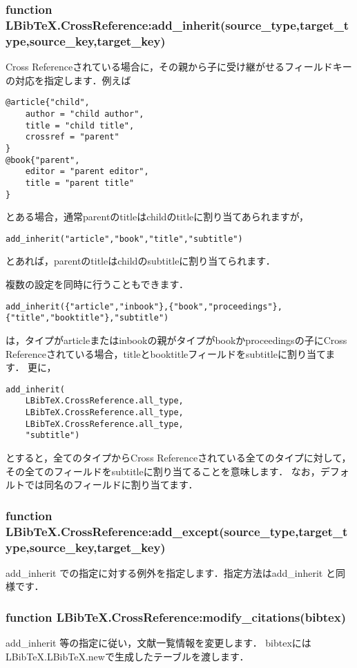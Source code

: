 \documentclass[dvipdfmx,a4paper]{jsarticle}
\begin{document}
\subsubsection{function LBibTeX.CrossReference:add\_inherit(source\_type,target\_type,source\_key,target\_key)}
Cross Referenceされている場合に，その親から子に受け継がせるフィールドキーの対応を指定します．例えば
\begin{verbatim}
@article{"child",
    author = "child author",
    title = "child title",
    crossref = "parent"
}
@book{"parent",
    editor = "parent editor",
    title = "parent title"
}
\end{verbatim}
とある場合，通常parentのtitleはchildのtitleに割り当てあられますが，
\begin{lstlisting}
add_inherit("article","book","title","subtitle")
\end{lstlisting}
とあれば，parentのtitleはchildのsubtitleに割り当てられます．

複数の設定を同時に行うこともできます．
\begin{lstlisting}
add_inherit({"article","inbook"},{"book","proceedings"},{"title","booktitle"},"subtitle")
\end{lstlisting}
は，タイプがarticleまたはinbookの親がタイプがbookかproceedingsの子にCross Referenceされている場合，titleとbooktitleフィールドをsubtitleに割り当てます．
更に，
\begin{lstlisting}
add_inherit(
	LBibTeX.CrossReference.all_type,
	LBibTeX.CrossReference.all_type,
	LBibTeX.CrossReference.all_type,
	"subtitle")
\end{lstlisting}
とすると，全てのタイプからCross Referenceされている全てのタイプに対して，その全てのフィールドをsubtitleに割り当てることを意味します．
なお，デフォルトでは同名のフィールドに割り当てます．

\subsubsection{function LBibTeX.CrossReference:add\_except(source\_type,target\_type,source\_key,target\_key)}
add\_inherit での指定に対する例外を指定します．指定方法はadd\_inherit と同様です．

\subsubsection{function LBibTeX.CrossReference:modify\_citations(bibtex)}
add\_inherit 等の指定に従い，文献一覧情報を変更します．
bibtexにはLBibTeX.LBibTeX.newで生成したテーブルを渡します．
\end{document}
